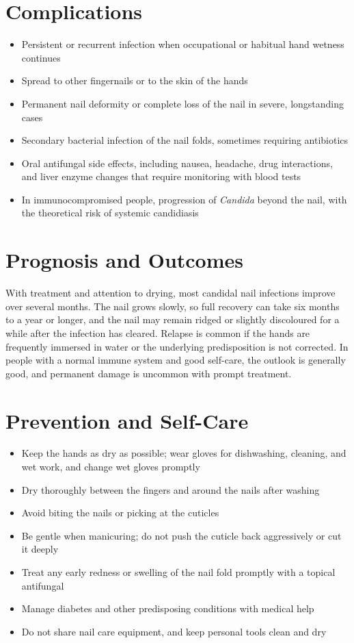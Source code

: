 \section*{Complications}
\begin{itemize}
    \item Persistent or recurrent infection when occupational or habitual hand wetness continues
    \item Spread to other fingernails or to the skin of the hands
    \item Permanent nail deformity or complete loss of the nail in severe, longstanding cases
    \item Secondary bacterial infection of the nail folds, sometimes requiring antibiotics
    \item Oral antifungal side effects, including nausea, headache, drug interactions, and liver enzyme changes that require monitoring with blood tests
    \item In immunocompromised people, progression of \textit{Candida} beyond the nail, with the theoretical risk of systemic candidiasis
\end{itemize}

\section*{Prognosis and Outcomes}
With treatment and attention to drying, most candidal nail infections improve over several months. The nail grows slowly, so full recovery can take six months to a year or longer, and the nail may remain ridged or slightly discoloured for a while after the infection has cleared. Relapse is common if the hands are frequently immersed in water or the underlying predisposition is not corrected. In people with a normal immune system and good self-care, the outlook is generally good, and permanent damage is uncommon with prompt treatment.

\section*{Prevention and Self-Care}
\begin{itemize}
    \item Keep the hands as dry as possible; wear gloves for dishwashing, cleaning, and wet work, and change wet gloves promptly
    \item Dry thoroughly between the fingers and around the nails after washing
    \item Avoid biting the nails or picking at the cuticles
    \item Be gentle when manicuring; do not push the cuticle back aggressively or cut it deeply
    \item Treat any early redness or swelling of the nail fold promptly with a topical antifungal
    \item Manage diabetes and other predisposing conditions with medical help
    \item Do not share nail care equipment, and keep personal tools clean and dry
\end{itemize}

